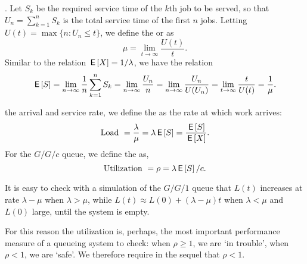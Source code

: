 .
Let $S_k$ be the required service time of the $k$th job to be served, so that $U_n = \sum_{k=1}^n S_k$ is the total service time of the first $n$ jobs.
Letting $ U(t) = \max\{n: U_n \leq t\}$, we define the  or 
as
\begin{equation*}
 \mu = \lim_{t\to\infty} \frac{U(t)}t.
\end{equation*}
Similar to the relation  $\,\mathsf{E}\left[X\right]= 1/\lambda$, we have the relation
\begin{equation*}
 \,\mathsf{E}\left[S\right] = \lim_{n\to\infty} \frac 1 n \sum_{k=1}^n S_k = \lim_{n\to\infty} \frac{U_n}{n} = \lim_{n\to\infty} \frac{U_n}{U(U_n)} = \lim_{t\to\infty} \frac t{U(t)} = \frac 1 \mu.
\end{equation*}




 the arrival and service rate, we define the  as  the rate at which work arrives:
\begin{equation*}
\textrm{Load } = \frac{\lambda}{\mu} = \lambda \,\mathsf{E}\left[S\right] = \frac{\,\mathsf{E}\left[S\right]}{\,\mathsf{E}\left[X\right]}.
\end{equation*}
For the $G/G/c$ queue, we define the  as,
\begin{equation*}
\textrm{Utilization } = \rho=\lambda \,\mathsf{E}\left[S\right] /c.
\end{equation*}

It is easy to check  with a simulation of the $G/G/1$ queue that $L(t)$ increases at rate $\lambda-\mu$ when $\lambda > \mu$, while $L(t) \approx L(0) + (\lambda - \mu)t$ when $\lambda< \mu$ and $L(0)$ large, until the system is empty.

For this reason the utilization is, perhaps, the most important performance measure of a queueing system to check: when $\rho\geq 1$, we are `in trouble', when $\rho < 1$, we are `safe'.
We therefore require in the sequel that $\rho<1$.



